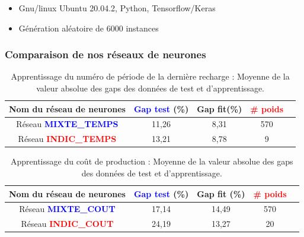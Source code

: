 \documentclass[hyperref={bookmarks=false},aspectratio=169]{beamer}
\begin{document}
\begin{frame}

\begin{itemize}
\item Gnu/linux Ubuntu 20.04.2, Python, Tensorflow/Keras
\item Génération aléatoire de 6000 instances

\end{itemize}
\frametitle{Comparaison de nos réseaux de neurones}
\begin{table}[H]
	\begin{center}
		\begin{tabular}{|c|c|c|c|c|}%
			\hline
				Nom du réseau de neurones & \textcolor{blue}{Gap test} (\%)&Gap fit(\%)& \textcolor{red}{\# poids}\\
			\hline
			Réseau \textcolor{blue}{\textbf{MIXTE\_TEMPS}} &11,26 & 8,31& 570 \\
			\hline
			Réseau \textcolor{red}{\textbf{INDIC\_TEMPS}} &13,21 &8,78 &9 \\
			\hline
		\end{tabular}
	\end{center}
	\caption{Apprentissage du numéro de période de la dernière recharge : Moyenne de la valeur absolue des gaps des données de test et d'apprentissage. \label{Gap_time}}
\end{table}

\begin{table}[H]
	\begin{center}
	\begin{tabular}{|c|c|c|c|c|}%
	\hline

	Nom du réseau de neurones & \textcolor{blue}{Gap test} (\%)&Gap fit (\%)& \textcolor{red}{\# poids}\\
	\hline
	Réseau \textcolor{blue}{\textbf{MIXTE\_COUT}} &17,14 & 14,49&570\\
	\hline
	Réseau \textcolor{red}{\textbf{INDIC\_COUT}} &24,19 &13,27 & 20\\
	\hline
\end{tabular}
	\end{center}
\caption{Apprentissage du coût de production : Moyenne de la valeur absolue des gaps des données de test et d'apprentissage. \label{Gap}}
\end{table}

\end{frame}
\end{document}
